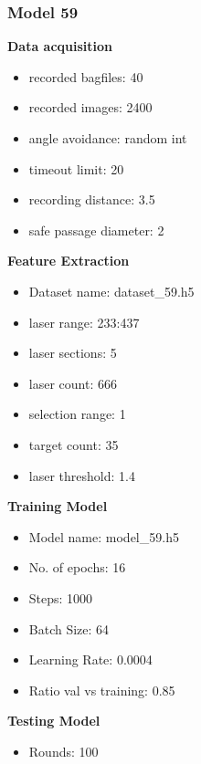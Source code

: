 \subsubsection{Model 59\label{model_59} }
\begin{multicols}{2}\textbf{Data acquisition}
\begin{itemize}
\setlength\itemsep{0.1em}
\item recorded bagfiles: 40
\item recorded images: 2400
\item angle avoidance: random int
\item timeout limit: 20
\item recording distance: 3.5
\item safe passage diameter: 2
\end{itemize}
\textbf{Feature Extraction}
\begin{itemize}
\setlength\itemsep{0.1em}
\item Dataset name: dataset\_59.h5
\item  laser range: 233:437
\item  laser sections: 5
\item  laser count: 666
\item  selection range: 1
\item  target count: 35
\item  laser threshold: 1.4
\end{itemize}
\columnbreak\textbf{Training Model}
\begin{itemize}
\setlength\itemsep{0.1em}
\item  Model name: model\_59.h5
\item  No. of epochs: 16
\item  Steps: 1000
\item  Batch Size: 64
\item  Learning Rate: 0.0004
\item  Ratio val vs training: 0.85
\end{itemize}
\textbf{Testing Model}
\begin{itemize}
\setlength\itemsep{0.1em}
\item Rounds: 100
\newline
\newline
\newline
\newline
\newline
\newline
\newline
\newline

\end{itemize}
\end{multicols}
